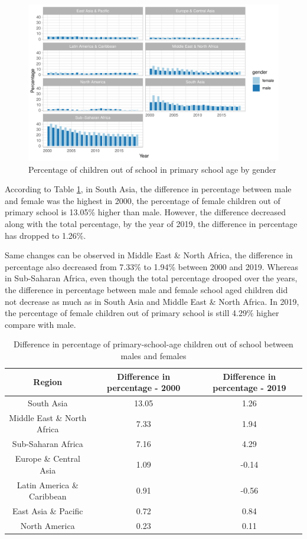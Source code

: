 \documentclass[11pt,a4paper,]{article}
\begin{document}
\begin{figure}
\centering
\includegraphics{report_files/figure-latex/plot2xw-1.pdf}
\caption{\label{fig:plot2xw}Percentage of children out of school in primary school age by gender}
\end{figure}

According to Table \ref{tab:tb1xw}, in South Asia, the difference in percentage between male and female was the highest in 2000, the percentage of female children out of primary school is 13.05\% higher than male. However, the difference decreased along with the total percentage, by the year of 2019, the difference in percentage has dropped to 1.26\%.

Same changes can be observed in Middle East \& North Africa, the difference in percentage also decreased from 7.33\% to 1.94\% between 2000 and 2019. Whereas in Sub-Saharan Africa, even though the total percentage drooped over the years, the difference in percentage between male and female school aged children did not decrease as much as in South Asia and Middle East \& North Africa. In 2019, the percentage of female children out of primary school is still 4.29\% higher compare with male.

\begin{table}[H]

\caption{\label{tab:tb1xw}Difference in percentage of primary-school-age children out of school between males and females}
\centering
\begin{tabular}[t]{c|c|c}
\hline
Region & Difference in percentage - 2000 & Difference in percentage - 2019\\
\hline
South Asia & 13.05 & 1.26\\
\hline
Middle East \& North Africa & 7.33 & 1.94\\
\hline
Sub-Saharan Africa & 7.16 & 4.29\\
\hline
Europe \& Central Asia & 1.09 & -0.14\\
\hline
Latin America \& Caribbean & 0.91 & -0.56\\
\hline
East Asia \& Pacific & 0.72 & 0.84\\
\hline
North America & 0.23 & 0.11\\
\hline
\end{tabular}
\end{table}
\end{document}
